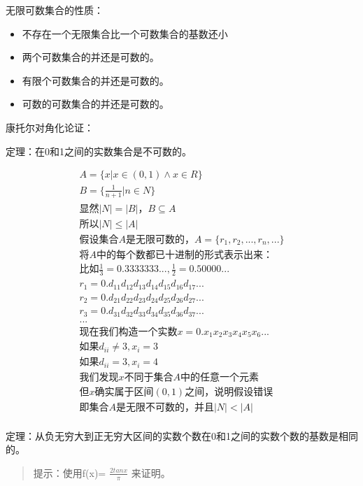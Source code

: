 \documentclass[12pt,a4paper,oneside]{ctexart}
\begin{document}
无限可数集合的性质：

\begin{itemize}
\item
  不存在一个无限集合比一个可数集合的基数还小
\item
  两个可数集合的并还是可数的。
\item
  有限个可数集合的并还是可数的。
\item
  可数的可数集合的并还是可数的。
\end{itemize}

康托尔对角化论证：

定理：在0和1之间的实数集合是不可数的。

\[\begin{gathered}
A=\{x|x\in(0,1)\wedge x\in R\}\\
B=\{\frac{1}{n+1}|n\in N\}\\
\text{显然}|N|=|B|，B\subseteq A\\
\text{所以}|N|\leqslant|A|\\
\text{假设集合}A\text{是无限可数的}，A=\{r_1,r_2,...,r_n,...\}\\
\text{将}A\text{中的每个数都已十进制的形式表示出来}：\\
\text{比如}\frac{1}{3}=0.3333333...,\frac{1}{2}=0.50000...\\
r_1=0.d_{11}d_{12}d_{13}d_{14}d_{15}d_{16}d_{17}...\\
r_2=0.d_{21}d_{22}d_{23}d_{24}d_{25}d_{26}d_{27}...\\
r_3=0.d_{31}d_{32}d_{33}d_{34}d_{35}d_{36}d_{37}...\\
...\\
\text{现在我们构造一个实数}x=0.x_1x_2x_3x_4x_5x_6...\\
\text{如果}d_{ii}\neq 3,x_i=3\\
\text{如果}d_{ii}=3,x_i=4\\
\text{我们发现}x\text{不同于集合}A\text{中的任意一个元素}\\
\text{但}x\text{确实属于区间}(0,1)\text{之间}，\text{说明假设错误}\\
\text{即集合}A\text{是无限不可数的}，\text{并且}|N|<|A|\\
\end{gathered}\]

定理：从负无穷大到正无穷大区间的实数个数在0和1之间的实数个数的基数是相同的。

\begin{quote}
提示：使用f(x)= \(\frac{2tanx}\pi\) 来证明。
\end{quote}
\end{document}
